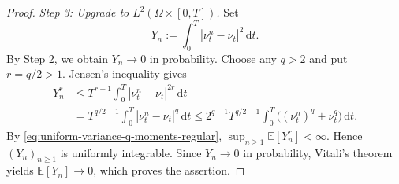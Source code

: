 \documentclass[10pt,a4paper,reqno]{amsart}
\theoremstyle{plain}
\theoremstyle{definition}
\theoremstyle{remark}
\theoremstyle{example}
\begin{document}
\begin{proof}
\emph{Step 3: Upgrade to $L^2(\Omega\times[0,T])$.}
Set
\[
    Y_n := \int_0^T |\nu_t^n-\nu_t|^2\,\mathrm dt.
\]
By Step 2, we obtain $Y_n\to0$ in probability. Choose any $q>2$ and put $r=q/2>1$. Jensen's inequality gives
\begin{align*}
    Y_n^r &\leq T^{r-1} \int_0^T |\nu_t^n-\nu_t|^{2r}\,\mathrm dt
    \\ &= T^{q/2-1} \int_0^T |\nu_t^n-\nu_t|^q\,\mathrm dt
    \leq 2^{q-1}T^{q/2-1} \int_0^T \bigl((\nu_t^n)^q+\nu_t^q\bigr)\,\mathrm dt.
\end{align*}
By \eqref{eq:uniform-variance-q-moments-regular}, $\sup_{n\geq1}\mathbb E[Y_n^r]<\infty$. Hence $(Y_n)_{n\geq1}$ is uniformly integrable. Since $Y_n\to0$ in probability, Vitali's theorem yields $\mathbb E[Y_n]\longrightarrow0$, which proves the assertion. 
\end{proof}



\end{document}
